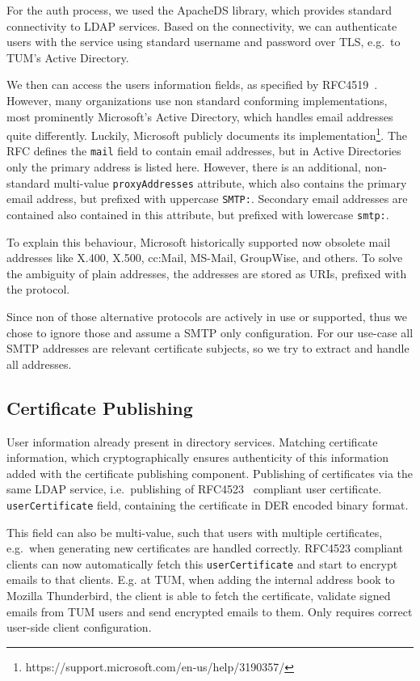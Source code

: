For the auth process, we used the ApacheDS library, which provides standard connectivity to LDAP services.
Based on the connectivity, we can authenticate users with the service using standard username and password over TLS,
e.g.\ to TUM's Active Directory.

We then can access the users information fields, as specified by RFC4519~\cite{RFC4519}.
However, many organizations use non standard conforming implementations, most prominently Microsoft's Active Directory,
which handles email addresses quite differently.
Luckily, Microsoft publicly documents its implementation\footnote{https://support.microsoft.com/en-us/help/3190357/}.
The RFC defines the \lstinline{mail} field to contain email addresses, but in Active Directories only the primary
address is listed here.
However, there is an additional, non-standard multi-value \lstinline{proxyAddresses} attribute, which also contains the
primary email address, but prefixed with uppercase \lstinline{SMTP:}.
Secondary email addresses are contained also contained in this attribute, but prefixed with lowercase \lstinline{smtp:}.

To explain this behaviour, Microsoft historically supported now obsolete mail addresses like X.400, X.500, cc:Mail,
MS-Mail, GroupWise, and others.
To solve the ambiguity of plain addresses, the addresses are stored as URIs\cite{RFC3986}, prefixed with the protocol.

Since non of those alternative protocols are actively in use or supported, thus we chose to ignore those and assume a
SMTP only configuration.
For our use-case all SMTP addresses are relevant certificate subjects, so we try to extract and handle all addresses.

\subsection*{Certificate Publishing}
User information already present in directory services.
Matching certificate information, which cryptographically ensures authenticity of this information added with the
certificate publishing component.
Publishing of certificates via the same LDAP service, i.e.\ publishing of RFC4523~\cite{RFC4523} compliant user
certificate.
\lstinline{userCertificate} field, containing the certificate in DER encoded binary format.

This field can also be multi-value, such that users with multiple certificates, e.g.\ when generating new certificates
are handled correctly.
RFC4523 compliant clients can now automatically fetch this \lstinline{userCertificate} and start to encrypt emails to
that clients.
E.g. at TUM, when adding the internal address book to Mozilla Thunderbird, the client is able to fetch the certificate,
validate signed emails from TUM users and send encrypted emails to them.
Only requires correct user-side client configuration.

